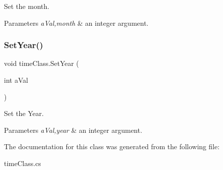 Set the month. 


\begin{DoxyParams}{Parameters}
{\em a\+Val,month} & an integer argument. \\
\hline
\end{DoxyParams}
\mbox{\label{classtime_class_a79d58ba7b93a061a0275fc5f0b70285c}} 
\subsubsection{\texorpdfstring{SetYear()}{SetYear()}}
{\footnotesize\ttfamily void time\+Class.\+Set\+Year (\begin{DoxyParamCaption}\item[{int}]{a\+Val }\end{DoxyParamCaption})\hspace{0.3cm}{\ttfamily [inline]}}



Set the Year. 


\begin{DoxyParams}{Parameters}
{\em a\+Val,year} & an integer argument. \\
\hline
\end{DoxyParams}


The documentation for this class was generated from the following file\+:\begin{DoxyCompactItemize}
\item 
time\+Class.\+cs\end{DoxyCompactItemize}
